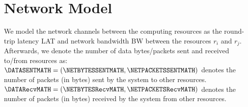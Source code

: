 


    \section{Network Model}
    \label{sec:network-model}

        We model the network channels between the computing resources as the round-trip latency LAT and network bandwidth BW between the resources $r_i$ and $r_j$.
        Afterwards, we denote the number of data bytes/packets sent and received to/from resources as: 
        $\DATASENTMATH = (\NETBYTESSENTMATH, \NETPACKETSSENTMATH)$ denotes the number of packets (in bytes) sent by the system to other resources.
        $\DATARecvMATH = (\NETBYTESRecvMATH, \NETPACKETSRecvMATH)$ denotes the number of packets (in bytes) received by the system from other resources.




